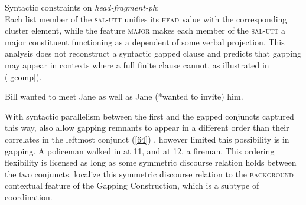  \ea
\label{gap-hf-con}
Syntactic constraints on \emph{head-fragment-ph}:\\
 \impl
{}
\z
 Each list member of the \textsc{sal-utt} unifies 
its \textsc{head} value with the corresponding cluster element, while the feature \textsc{major} makes each member of the \textsc{sal-utt} a major constituent functioning as a dependent of some verbal projection. %
This analysis does not reconstruct a syntactic gapped clause and %
predicts that gapping may appear in contexts where a full finite clause cannot, as illustrated in (\ref{gcomp}).
 
 \ea 
 Bill wanted to meet Jane as well as Jane (*wanted to invite) him. \citep[242]{Abeille2014}\label{gcomp}
 \z
%

   With syntactic parallelism between the first and
   the gapped conjuncts captured this way, \citet{Abeille2014} also allow 
    gapping remnants to appear in a different order than their correlates in the leftmost conjunct (\ref{64}) \citep[see][156--158]{Sag1985}, however limited this possibility is in gapping.
%
\ea A policeman walked in at 11, and at 12, a fireman. \label{64}\z
%
%
This ordering flexibility is licensed as long as some symmetric discourse relation holds between the two conjuncts. \citet{Abeille2014} 
localize this symmetric discourse relation to the \textsc{background} contextual feature of the Gapping Construction, which is a subtype of coordination. 


